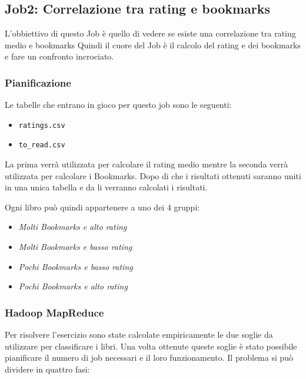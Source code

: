 \subsection{Job2: Correlazione tra rating e bookmarks}

L'obbiettivo di questo Job è quello di vedere se esiste una correlazione tra rating medio e bookmarks
Quindi il cuore del Job è il calcolo del rating e dei bookmarks e fare un confronto incrociato.

\subsubsection{Pianificazione}
Le tabelle che entrano in gioco per questo job sono le seguenti:
\begin{itemize}
    \item \texttt{ratings.csv}
    \item \texttt{to\_read.csv}
\end{itemize}

La prima verrà utilizzata per calcolare il rating medio mentre la seconda verrà utilizzata per calcolare i Bookmarks.
Dopo di che i risultati ottenuti saranno uniti in una unica tabella e da li verranno calcolati i risultati.

Ogni libro può quindi appartenere a uno dei 4 gruppi:
\begin{itemize}
    \item \textit{Molti Bookmarks e alto rating}
    \item \textit{Molti Bookmarks e basso rating}
    \item \textit{Pochi Bookmarks e basso rating}
    \item \textit{Pochi Bookmarks e alto rating}
\end{itemize}

\subsubsection{Hadoop MapReduce}

Per risolvere l'esercizio sono state calcolate empiricamente le due soglie da utilizzare per classificare i libri.
Una volta ottenute queste soglie è stato possibile pianificare il numero di job necessari e il loro funzionamento.
Il problema si può dividere in quattro fasi:

